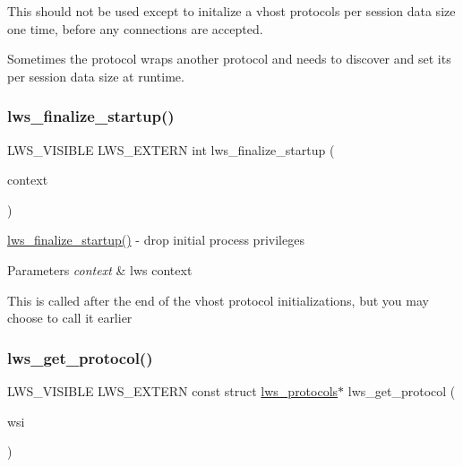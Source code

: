 This should not be used except to initalize a vhost protocol\textquotesingle{}s per session data size one time, before any connections are accepted.

Sometimes the protocol wraps another protocol and needs to discover and set its per session data size at runtime. \mbox{\label{group__Protocols-and-Plugins_ga106b37ae9c247e84d191ab09441adc43}} 
\subsubsection{\texorpdfstring{lws\+\_\+finalize\+\_\+startup()}{lws\_finalize\_startup()}}
{\footnotesize\ttfamily L\+W\+S\+\_\+\+V\+I\+S\+I\+B\+LE L\+W\+S\+\_\+\+E\+X\+T\+E\+RN int lws\+\_\+finalize\+\_\+startup (\begin{DoxyParamCaption}\item[{struct \hyperlink{structlws__context}{lws\+\_\+context} $\ast$}]{context }\end{DoxyParamCaption})}

\hyperlink{group__Protocols-and-Plugins_ga106b37ae9c247e84d191ab09441adc43}{lws\+\_\+finalize\+\_\+startup()} -\/ drop initial process privileges


\begin{DoxyParams}{Parameters}
{\em context} & lws context\\
\hline
\end{DoxyParams}
This is called after the end of the vhost protocol initializations, but you may choose to call it earlier \mbox{\label{group__Protocols-and-Plugins_ga72ad550786ca7976463589d347e62112}} 
\subsubsection{\texorpdfstring{lws\+\_\+get\+\_\+protocol()}{lws\_get\_protocol()}}
{\footnotesize\ttfamily L\+W\+S\+\_\+\+V\+I\+S\+I\+B\+LE L\+W\+S\+\_\+\+E\+X\+T\+E\+RN const struct \hyperlink{structlws__protocols}{lws\+\_\+protocols}$\ast$ lws\+\_\+get\+\_\+protocol (\begin{DoxyParamCaption}\item[{struct \hyperlink{structlws}{lws} $\ast$}]{wsi }\end{DoxyParamCaption})}

